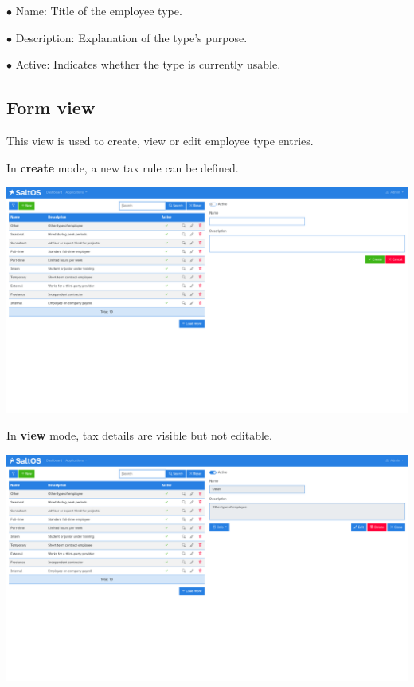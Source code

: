 \documentclass[a4paper]{article}
\begin{document}
\begin{compactitem}
\item[\color{myblue}$\bullet$] Name: Title of the employee type.
\item[\color{myblue}$\bullet$] Description: Explanation of the type’s purpose.
\item[\color{myblue}$\bullet$] Active: Indicates whether the type is currently usable.
\end{compactitem}

\hypertarget{toc114}{}
\subsection{Form view}

This view is used to create, view or edit employee type entries.

In \textbf{create} mode, a new tax rule can be defined.

\begin{center}\includegraphics[width=1\textwidth]{../ujest/snaps/test-screenshots-js-screenshots-hr-employees-types-create-en-us-1-snap.png}\end{center}

In \textbf{view} mode, tax details are visible but not editable.

\begin{center}\includegraphics[width=1\textwidth]{../ujest/snaps/test-screenshots-js-screenshots-hr-employees-types-view-10-en-us-1-snap.png}\end{center}
\end{document}
